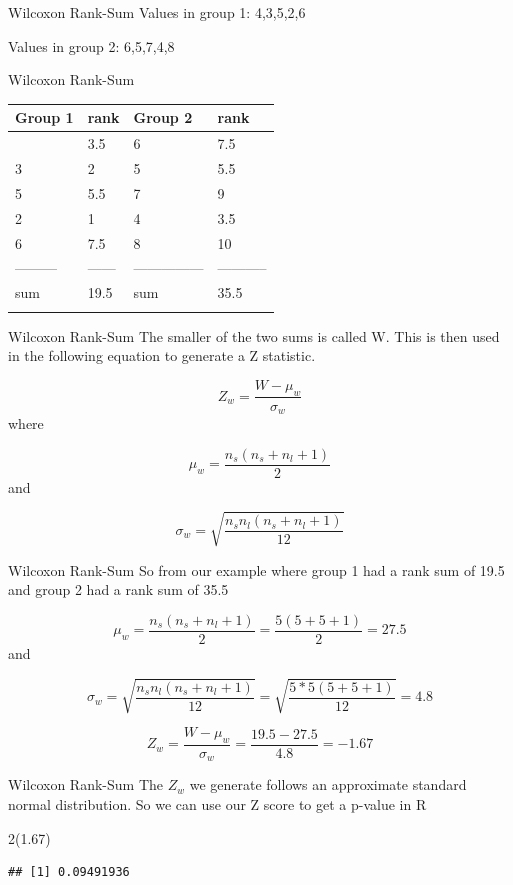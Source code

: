 \documentclass[
  ignorenonframetext,
  aspectratio=169]{beamer}
\newenvironment{Shaded}{\begin{snugshade}}{\end{snugshade}}
\newcommand{\DecValTok}[1]{\textcolor[rgb]{0.00,0.00,0.81}{#1}}
\newcommand{\FloatTok}[1]{\textcolor[rgb]{0.00,0.00,0.81}{#1}}
\newcommand{\FunctionTok}[1]{\textcolor[rgb]{0.13,0.29,0.53}{\textbf{#1}}}
\newcommand{\NormalTok}[1]{#1}
\newcommand{\SpecialCharTok}[1]{\textcolor[rgb]{0.81,0.36,0.00}{\textbf{#1}}}
\renewcommand{\textbf}{\structure}
\begin{document}
\begin{frame}{Wilcoxon Rank-Sum}
\protect\hypertarget{wilcoxon-rank-sum-2}{}
Values in group 1: 4,3,5,2,6

Values in group 2: 6,5,7,4,8
\end{frame}

\begin{frame}{Wilcoxon Rank-Sum}
\protect\hypertarget{wilcoxon-rank-sum-3}{}
\begin{longtable}[]{@{}llll@{}}
\toprule\noalign{}
Group 1 & rank & Group 2 & rank \\
\midrule\noalign{}
\endhead
4 & 3.5 & 6 & 7.5 \\
3 & 2 & 5 & 5.5 \\
5 & 5.5 & 7 & 9 \\
2 & 1 & 4 & 3.5 \\
6 & 7.5 & 8 & 10 \\
--------- & ------ & --------------- & ----------- \\
sum & 19.5 & sum & 35.5 \\
\bottomrule\noalign{}
\end{longtable}
\end{frame}

\begin{frame}{Wilcoxon Rank-Sum}
\protect\hypertarget{wilcoxon-rank-sum-4}{}
The smaller of the two sums is called W. This is then used in the
following equation to generate a Z statistic.

\[Z_{w}=\frac{W-\mu_w}{\sigma_{w}}\] where

\[\mu_w=\frac{n_s(n_s+n_l+1)}{2}\] and

\[\sigma_{w}=\sqrt{\frac{n_sn_l(n_s+n_l+1)}{12}}\]
\end{frame}

\begin{frame}{Wilcoxon Rank-Sum}
\protect\hypertarget{wilcoxon-rank-sum-5}{}
So from our example where group 1 had a rank sum of 19.5 and group 2 had
a rank sum of 35.5

\[\mu_w=\frac{n_s(n_s+n_l+1)}{2}=\frac{5(5+5+1)}{2}=27.5\] and

\[\sigma_{w}=\sqrt{\frac{n_sn_l(n_s+n_l+1)}{12}}=\sqrt{\frac{5*5(5+5+1)}{12}}=4.8\]

\[Z_{w}=\frac{W-\mu_w}{\sigma_{w}}=\frac{19.5-27.5}{4.8}=-1.67\]
\end{frame}

\begin{frame}[fragile]{Wilcoxon Rank-Sum}
\protect\hypertarget{wilcoxon-rank-sum-6}{}
The \(Z_{w}\) we generate follows an approximate standard normal
distribution. So we can use our Z score to get a p-value in R

\begin{Shaded}
\begin{Highlighting}[]
\DecValTok{2}\SpecialCharTok{*}\FunctionTok{pnorm}\NormalTok{(}\SpecialCharTok{{-}}\FloatTok{1.67}\NormalTok{)}
\end{Highlighting}
\end{Shaded}

\begin{verbatim}
## [1] 0.09491936
\end{verbatim}
\end{frame}
\end{document}
